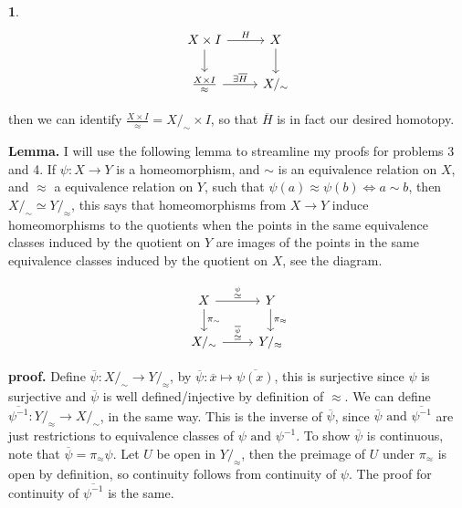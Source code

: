 \documentclass[10.5pt]{article}
\theoremstyle{definition}
\newtheorem{pb}{}
\newcommand{\tand}{\text{ and }}
\newcommand{\ism}{\simeq}
\begin{document}
\begin{pb}
        \begin{equation*} 
            \begin{tikzcd}
                X\times I\arrow[r, "H"] \arrow[d]& X\arrow[d]\\
                \frac{X \times I}{\approx}\arrow[r, "\exists \overline{H}"]& X/_\sim
            \end{tikzcd}
        \end{equation*}

        then we can identify \(\frac{X \times I}{\approx} = X/_\sim \times I\), so that \(\overline{H}\) is in fact our desired homotopy.
    \end{pb}
    \newpage

    \textbf{Lemma.} I will use the following lemma to streamline my proofs for problems 3 and 4. \newline
    If \(\psi: X \to Y\) is a homeomorphism, and \(\sim\) is an equivalence relation on \(X\), and \(\approx\) a equivalence relation on \(Y\), such that
    \(\psi(a) \approx \psi(b) \iff a \sim b\), then \(X/_\sim \ism Y/_\approx\), this says that homeomorphisms from \(X \to Y\) induce homeomorphisms to the quotients when the points in the same equivalence
    classes induced by the quotient on \(Y\) are images of the points in the same equivalence classes induced by the quotient on \(X\), see the diagram.

    \begin{equation*} 
        \begin{tikzcd}
            X\arrow[r, "\overset{\psi}{\ism}"] \arrow[d, "\pi_\sim"]& Y\arrow[d, "\pi_\approx"]\\
            X/_\sim\arrow[r, "\overset{\overline{\psi}}{\ism}"]& Y/_\approx
        \end{tikzcd}
    \end{equation*}

    \textbf{proof.} Define \(\overline{\psi}: X/_\sim \to Y/_\approx\), by \(\overline{\psi}: \overline{x} \mapsto \overline{\psi(x)}\), this is surjective since \(\psi\) is surjective and \(\overline{\psi}\) is
    well defined/injective by definition of \(\approx\). We can define \(\overline{\psi^{-1}}: Y/_\approx \to X/_\sim\), in the same way. This is the inverse of \(\overline{\psi}\), since
    \(\overline{\psi} \tand \overline{\psi^{-1}}\) are just restrictions to equivalence classes of \(\psi \tand \psi^{-1}\). To show \(\overline{\psi}\) is continuous, note that
    \(\overline{\psi} = \pi_\approx \psi\). Let \(U\) be open in \(Y/_\approx\), then the preimage of \(U\) under \(\pi_\approx \) is open by definition, so continuity follows from continuity of \(\psi\).
    The proof for continuity of \(\overline{\psi^{-1}}\) is the same.
\end{document}

